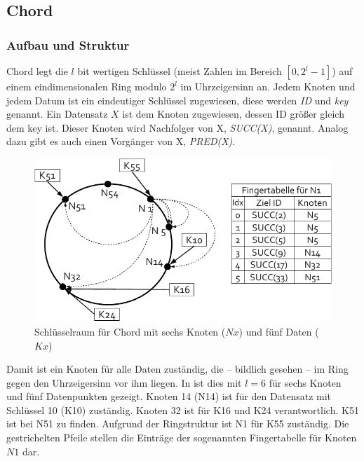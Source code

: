 \subsection{Chord}
\label{chap:evaluation_chord}

\subsubsection{Aufbau und Struktur}
Chord \cite{Stoica2003} legt die $l$ bit wertigen Schlüssel (meist Zahlen im Bereich $[0,2^l-1]$) auf einem eindimensionalen Ring modulo $2^l$ im Uhrzeigersinn an. Jedem Knoten und jedem Datum ist ein eindeutiger Schlüssel zugewiesen, diese werden \emph{ID} und \emph{key} genannt. Ein Datensatz $X$ ist dem Knoten zugewiesen, dessen ID größer gleich dem key ist. Dieser Knoten wird Nachfolger von X, \emph{SUCC(X)}, genannt. Analog dazu gibt es auch einen Vorgänger von X, \emph{PRED(X)}.

\begin{figure}[htbp]
\centering
\includegraphics{grafics/chord_key_space.pdf}
\caption{Schlüsselraum für Chord mit sechs Knoten ($Nx$) und fünf Daten ($Kx$)}
\label{fig:chord_key_space}
\end{figure}

Damit ist ein Knoten für alle Daten zuständig, die -- bildlich gesehen -- im Ring gegen den Uhrzeigersinn vor ihm liegen. In  ist dies mit $l=6$ für sechs Knoten und fünf Datenpunkten gezeigt. Knoten 14 (N14) ist für den Datensatz mit Schlüssel 10 (K10) zuständig. Knoten 32 ist für K16 und K24 verantwortlich. K51 ist bei N51 zu finden. Aufgrund der Ringstruktur ist N1 für K55 zuständig. Die gestrichelten Pfeile stellen die Einträge der sogenannten Fingertabelle für Knoten $N1$ dar. 

